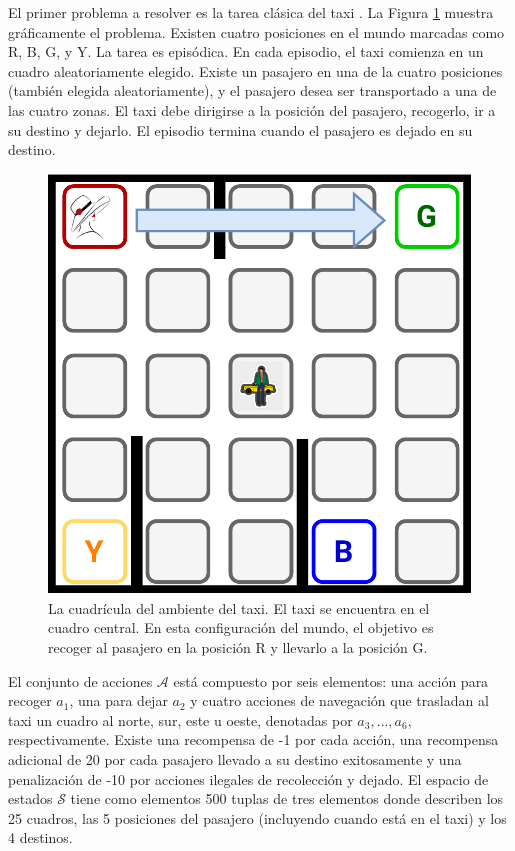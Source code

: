 El primer problema a resolver es la tarea clásica del taxi \cite{Dietterich:2000:HRL:1622262.1622268}.
La Figura \ref{fig:taxi} muestra gráficamente el problema.
Existen cuatro posiciones en el mundo marcadas como R, B, G, y Y. 
La tarea es episódica. En cada episodio, 
el taxi comienza en un cuadro aleatoriamente elegido. 
Existe un pasajero en una de la cuatro posiciones (también elegida
aleatoriamente), y el pasajero desea ser transportado a una de las
cuatro zonas.
El taxi debe dirigirse a la posición del pasajero, recogerlo, ir a su destino y dejarlo.
El episodio termina cuando el pasajero es dejado en su destino.

\begin{figure}[H]
    \centering
    \includegraphics[scale=0.25]{Chapter5/Figs/taxi-env.pdf}
    \caption{La cuadrícula del ambiente del taxi. El taxi se encuentra en el cuadro central. En esta configuración del mundo, el objetivo es recoger al pasajero en la posición R y llevarlo a la posición G.}
    \label{fig:taxi}
\end{figure}

El conjunto de acciones $\mathcal{A}$ está compuesto por seis elementos: una acción para recoger $a_1$, una para dejar $a_2$ y
cuatro acciones de 
navegación que trasladan al taxi un cuadro al norte, sur, 
este u oeste, denotadas por $a_3, \dots, a_6$, respectivamente.
Existe una recompensa de -1 por cada acción, una recompensa adicional de 20 por cada pasajero llevado a su destino 
exitosamente y una penalización de -10 por acciones ilegales
de recolección y dejado.
El espacio de estados $\mathcal{S}$ tiene como elementos 
500 tuplas de tres elementos donde describen los 25 cuadros, las 5 posiciones del pasajero (incluyendo cuando está en el taxi) y los 4 destinos.


